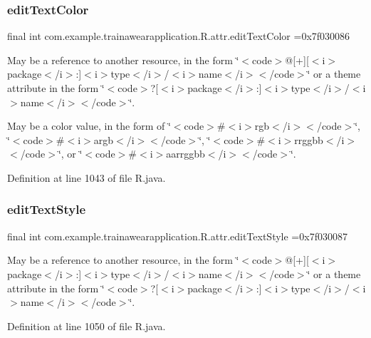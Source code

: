 \subsubsection{\texorpdfstring{editTextColor}{editTextColor}}
{\footnotesize\ttfamily final int com.\+example.\+trainawearapplication.\+R.\+attr.\+edit\+Text\+Color =0x7f030086\hspace{0.3cm}{\ttfamily [static]}}

May be a reference to another resource, in the form \char`\"{}$<$code$>$@\mbox{[}+\mbox{]}\mbox{[}$<$i$>$package$<$/i$>$\+:\mbox{]}$<$i$>$type$<$/i$>$/$<$i$>$name$<$/i$>$$<$/code$>$\char`\"{} or a theme attribute in the form \char`\"{}$<$code$>$?\mbox{[}$<$i$>$package$<$/i$>$\+:\mbox{]}$<$i$>$type$<$/i$>$/$<$i$>$name$<$/i$>$$<$/code$>$\char`\"{}. 

May be a color value, in the form of \char`\"{}$<$code$>$\#$<$i$>$rgb$<$/i$>$$<$/code$>$\char`\"{}, \char`\"{}$<$code$>$\#$<$i$>$argb$<$/i$>$$<$/code$>$\char`\"{}, \char`\"{}$<$code$>$\#$<$i$>$rrggbb$<$/i$>$$<$/code$>$\char`\"{}, or \char`\"{}$<$code$>$\#$<$i$>$aarrggbb$<$/i$>$$<$/code$>$\char`\"{}. 

Definition at line 1043 of file R.\+java.

\mbox{\label{classcom_1_1example_1_1trainawearapplication_1_1_r_1_1attr_a0d7ea3c80416f2672c298d80efee5f33}} 
\subsubsection{\texorpdfstring{editTextStyle}{editTextStyle}}
{\footnotesize\ttfamily final int com.\+example.\+trainawearapplication.\+R.\+attr.\+edit\+Text\+Style =0x7f030087\hspace{0.3cm}{\ttfamily [static]}}

May be a reference to another resource, in the form \char`\"{}$<$code$>$@\mbox{[}+\mbox{]}\mbox{[}$<$i$>$package$<$/i$>$\+:\mbox{]}$<$i$>$type$<$/i$>$/$<$i$>$name$<$/i$>$$<$/code$>$\char`\"{} or a theme attribute in the form \char`\"{}$<$code$>$?\mbox{[}$<$i$>$package$<$/i$>$\+:\mbox{]}$<$i$>$type$<$/i$>$/$<$i$>$name$<$/i$>$$<$/code$>$\char`\"{}. 

Definition at line 1050 of file R.\+java.

